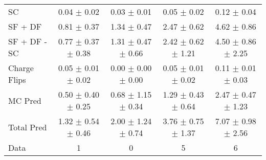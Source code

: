 \begin{tabular}{l|cccc}
                                 SC &  0.04 $\pm$  0.02 &  0.03 $\pm$  0.01 &  0.05 $\pm$  0.02 &  0.12 $\pm$  0.04 \\
                            SF + DF &  0.81 $\pm$  0.37 &  1.34 $\pm$  0.47 &  2.47 $\pm$  0.62 &  4.62 $\pm$  0.86 \\
\hline
                       SF + DF - SC &  0.77 $\pm$  0.37 $\pm$  0.38 &  1.31 $\pm$  0.47 $\pm$  0.66 &  2.42 $\pm$  0.62 $\pm$  1.21 &  4.50 $\pm$  0.86 $\pm$  2.25 \\
\hline\hline
                       Charge Flips &  0.05 $\pm$  0.01 $\pm$  0.02 &  0.00 $\pm$  0.00 $\pm$  0.00 &  0.05 $\pm$  0.01 $\pm$  0.02 &  0.11 $\pm$  0.01 $\pm$  0.03 \\
\hline
                            MC Pred &  0.50 $\pm$  0.40 $\pm$  0.25 &  0.68 $\pm$  1.15 $\pm$  0.34 &  1.29 $\pm$  0.43 $\pm$  0.64 &  2.47 $\pm$  0.47 $\pm$  1.23 \\
\hline
                         Total Pred &  1.32 $\pm$  0.54 $\pm$  0.46 &  2.00 $\pm$  1.24 $\pm$  0.74 &  3.76 $\pm$  0.75 $\pm$  1.37 &  7.07 $\pm$  0.98 $\pm$  2.56 \\
\hline\hline
                               Data &     1 &     0 &     5 &     6 \\
\hline\hline
\end{tabular}

